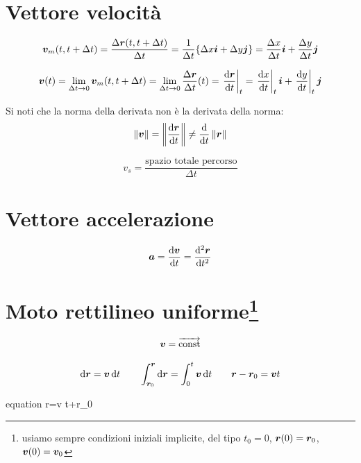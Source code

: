 \section{Vettore velocità}
\begin{Def}
  \[\boldsymbol{v}_m(t,t+\Delta t)=\frac{\Delta\boldsymbol{r}(t,t+\Delta t)}{\Delta
      t}=\frac{1}{\Delta t}\{\Delta x\boldsymbol{i}+\Delta y\boldsymbol{j}\}=\frac{\Delta x}{\Delta t}\boldsymbol{i}+\frac{\Delta y}{\Delta t}\boldsymbol{j}\]
\end{Def}
\begin{Def}
  \[\boldsymbol{v}(t)=\lim_{\Delta t\rightarrow 0}\boldsymbol{v}_m(t,t+\Delta t)=\lim_{\Delta t\rightarrow 0} \frac{\Delta\boldsymbol{r}}{\Delta t}(t)={\left.\frac{\mathrm{d} \boldsymbol{r}}{\mathrm{d} t}\right|_t}=\left.\frac{\mathrm{d} x}{\mathrm{d} t}\right|_t\boldsymbol{i}+\left.\frac{\mathrm{d} y}{\mathrm{d} t}\right|_t\boldsymbol{j}\]
\end{Def}
Si noti che la norma della derivata non è la derivata della norma:
\[\left\lVert\boldsymbol{v}\right\rVert=\left\lVert\frac{\mathrm{d}\boldsymbol{r}}{\mathrm{d} t}\right\rVert\neq\frac{\mathrm{d}}{\mathrm{d} t}\left\lVert\boldsymbol{r}\right\rVert\]
\begin{Def}
  \[v_s=\frac{\text{spazio totale percorso}}{\Delta t}\]
\end{Def}
\section{Vettore accelerazione}
\begin{Def}
  \[\boldsymbol{a}=\frac{\mathrm{d} \boldsymbol{v}}{\mathrm{d} t}={\frac{\mathrm{d}^2 \boldsymbol{r}}{\mathrm{d} t^2}}\]
\end{Def}
\section[Moto rettilineo uniforme]{Moto rettilineo uniforme\protect\footnote{usiamo sempre condizioni iniziali implicite, del tipo $t_0=0$, $\boldsymbol{r}(0)=\boldsymbol{r}_0$, $\boldsymbol{v}(0)=\boldsymbol{v}_0$}}
\begin{Def}
  \[\boldsymbol{v}=\overrightarrow{\text{const}}\]
\end{Def}
\[\mathrm{d}\boldsymbol{r}=\boldsymbol{v}\,\mathrm{d} t\qquad\int_{\boldsymbol{r}_0}^{\boldsymbol{r}}\mathrm{d}\boldsymbol{r}=\int_0^t\boldsymbol{v}\,\mathrm{d} t \qquad \boldsymbol{r}-\boldsymbol{r}_0=\boldsymbol{v} t\]
\begin{eqimp}{equation}
  \ve r=\ve v t+\ve r_0
\end{eqimp}
